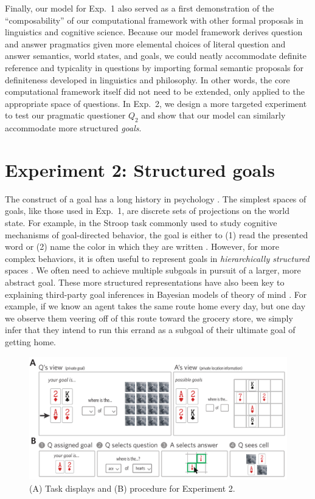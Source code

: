 \documentclass[11pt, floatsintext]{apa6}
\begin{document}
Finally, our model for Exp.~1 also served as a first demonstration of the ``composability'' of our computational framework with other formal proposals in linguistics and cognitive science.
Because our model framework derives question and answer pragmatics given more elemental choices of literal question and answer semantics, world states, and goals, we could neatly accommodate definite reference and typicality in questions by importing formal semantic proposals for definiteness developed in linguistics and philosophy.
In other words, the core computational framework itself did not need to be extended, only applied to the appropriate space of questions. 
In Exp.~2, we design a more targeted experiment to test our pragmatic questioner $Q_2$ and show that our model can similarly accommodate more structured \emph{goals}.

\section{Experiment 2: Structured goals}

The construct of a goal has a long history in psychology \cite{miller1960plans, Schank:1977hh, austin1996goal}.
The simplest spaces of goals, like those used in Exp.~1, are discrete sets of projections on the world state.
For example, in the Stroop task commonly used to study cognitive mechanisms of goal-directed behavior, the goal is either to (1) read the presented word or (2) name the color in which they are written \cite{miller2001integrative}.
However, for more complex behaviors, it is often useful to represent goals in \emph{hierarchically structured} spaces \cite{badre2008cognitive,botvinick2008hierarchical}. 
We often need to achieve multiple subgoals in pursuit of a larger, more abstract goal. 
These more structured representations have also been key to explaining third-party goal inferences in Bayesian models of theory of mind \cite{BakerSaxeTenenbaum09_ActionUnderstandingInversePlanning}. 
For example, if we know an agent takes the same route home every day, but one day we observe them veering off of this route toward the grocery store, we simply infer that they intend to run this errand as a subgoal of their ultimate goal of getting home. 

\begin{figure}[th!]
\begin{center}
\includegraphics[scale = .9]{Exp2/task.pdf}
\end{center}
\caption{(A) Task displays and (B) procedure for Experiment 2.}
\label{fig:exp2task}
\end{figure}
\end{document}
